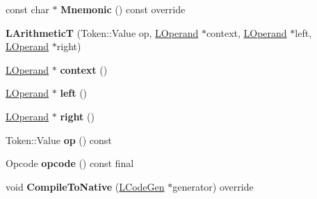 \begin{DoxyCompactItemize}
\item 
const char $\ast$ {\bfseries Mnemonic} () const  override\hypertarget{classv8_1_1internal_1_1_l_arithmetic_t_abaa7a014d65c1b89c93ab7fc44003c15}{}\label{classv8_1_1internal_1_1_l_arithmetic_t_abaa7a014d65c1b89c93ab7fc44003c15}

\item 
{\bfseries L\+ArithmeticT} (Token\+::\+Value op, \hyperlink{classv8_1_1internal_1_1_l_operand}{L\+Operand} $\ast$context, \hyperlink{classv8_1_1internal_1_1_l_operand}{L\+Operand} $\ast$left, \hyperlink{classv8_1_1internal_1_1_l_operand}{L\+Operand} $\ast$right)\hypertarget{classv8_1_1internal_1_1_l_arithmetic_t_aed09089ca0bd6bd7614897b04b1d89d6}{}\label{classv8_1_1internal_1_1_l_arithmetic_t_aed09089ca0bd6bd7614897b04b1d89d6}

\item 
\hyperlink{classv8_1_1internal_1_1_l_operand}{L\+Operand} $\ast$ {\bfseries context} ()\hypertarget{classv8_1_1internal_1_1_l_arithmetic_t_ab306728ac49c78f6fe8eec0faafec98d}{}\label{classv8_1_1internal_1_1_l_arithmetic_t_ab306728ac49c78f6fe8eec0faafec98d}

\item 
\hyperlink{classv8_1_1internal_1_1_l_operand}{L\+Operand} $\ast$ {\bfseries left} ()\hypertarget{classv8_1_1internal_1_1_l_arithmetic_t_a62140bad6c260c92f8c86d7083874a9c}{}\label{classv8_1_1internal_1_1_l_arithmetic_t_a62140bad6c260c92f8c86d7083874a9c}

\item 
\hyperlink{classv8_1_1internal_1_1_l_operand}{L\+Operand} $\ast$ {\bfseries right} ()\hypertarget{classv8_1_1internal_1_1_l_arithmetic_t_ad65b8493527788115befa0634f9de1ae}{}\label{classv8_1_1internal_1_1_l_arithmetic_t_ad65b8493527788115befa0634f9de1ae}

\item 
Token\+::\+Value {\bfseries op} () const \hypertarget{classv8_1_1internal_1_1_l_arithmetic_t_ab6979d3ffa80748d912d58539cfe971c}{}\label{classv8_1_1internal_1_1_l_arithmetic_t_ab6979d3ffa80748d912d58539cfe971c}

\item 
Opcode {\bfseries opcode} () const  final\hypertarget{classv8_1_1internal_1_1_l_arithmetic_t_a8d6b88539ede3b7730f5edab5b509018}{}\label{classv8_1_1internal_1_1_l_arithmetic_t_a8d6b88539ede3b7730f5edab5b509018}

\item 
void {\bfseries Compile\+To\+Native} (\hyperlink{classv8_1_1internal_1_1_l_code_gen}{L\+Code\+Gen} $\ast$generator) override\hypertarget{classv8_1_1internal_1_1_l_arithmetic_t_a2ca63e96840eacc1494d0d39ebe782a5}{}\label{classv8_1_1internal_1_1_l_arithmetic_t_a2ca63e96840eacc1494d0d39ebe782a5}


\end{DoxyCompactItemize}

